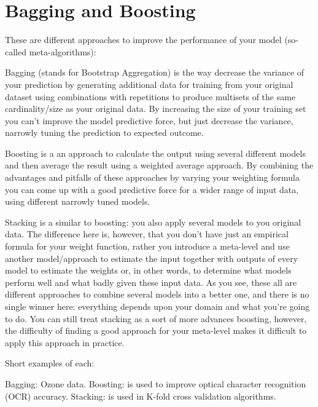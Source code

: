 \documentclass[caret-main.tex]{subfiles}
\begin{document}
\section{Bagging and Boosting}
These are different approaches to improve the performance of your model (so-called meta-algorithms):

Bagging (stands for Bootstrap Aggregation) is the way decrease the variance of your prediction by generating additional data for training from your original dataset using combinations with repetitions to produce multisets of the same cardinality/size as your original data. By increasing the size of your training set you can't improve the model predictive force, but just decrease the variance, narrowly tuning the prediction to expected outcome.

Boosting is a an approach to calculate the output using several different models and then average the result using a weighted average approach. By combining the advantages and pitfalls of these approaches by varying your weighting formula you can come up with a good predictive force for a wider range of input data, using different narrowly tuned models.

Stacking is a similar to boosting: you also apply several models to you original data. The difference here is, however, that you don't have just an empirical formula for your weight function, rather you introduce a meta-level and use another model/approach to estimate the input together with outputs of every model to estimate the weights or, in other words, to determine what models perform well and what badly given these input data.
As you see, these all are different approaches to combine several models into a better one, and there is no single winner here: everything depends upon your domain and what you're going to do. You can still treat stacking as a sort of more advances boosting, however, the difficulty of finding a good approach for your meta-level makes it difficult to apply this approach in practice.

Short examples of each:

Bagging: Ozone data.
Boosting: is used to improve optical character recognition (OCR) accuracy.
Stacking: is used in K-fold cross validation algorithms.


\end{document}
